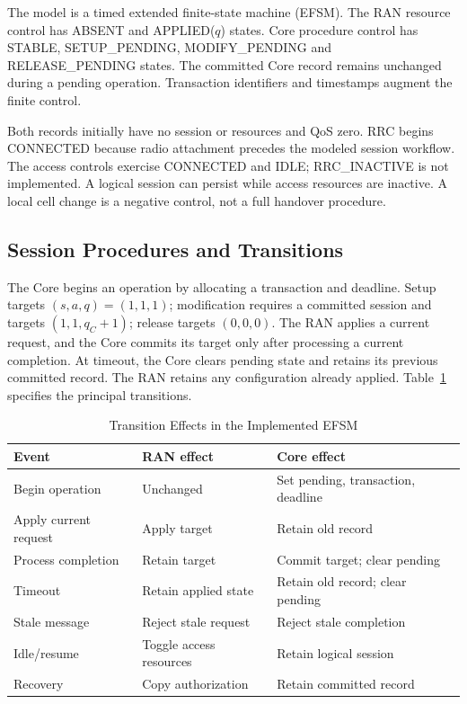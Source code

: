 \documentclass[conference]{IEEEtran}
\begin{document}
The model is a timed extended finite-state machine (EFSM). The RAN resource control has ABSENT and APPLIED($q$) states. Core procedure control has STABLE, SETUP\_PENDING, MODIFY\_PENDING and RELEASE\_PENDING states. The committed Core record remains unchanged during a pending operation. Transaction identifiers and timestamps augment the finite control.

Both records initially have no session or resources and QoS zero. RRC begins CONNECTED because radio attachment precedes the modeled session workflow. The access controls exercise CONNECTED and IDLE; RRC\_INACTIVE is not implemented. A logical session can persist while access resources are inactive. A local cell change is a negative control, not a full handover procedure.

\subsection{Session Procedures and Transitions}
The Core begins an operation by allocating a transaction and deadline. Setup targets $(s,a,q)=(1,1,1)$; modification requires a committed session and targets $(1,1,q_C+1)$; release targets $(0,0,0)$. The RAN applies a current request, and the Core commits its target only after processing a current completion. At timeout, the Core clears pending state and retains its previous committed record. The RAN retains any configuration already applied. Table~\ref{tab:transitions} specifies the principal transitions.

\begin{table}[t]
\caption{Transition Effects in the Implemented EFSM}
\label{tab:transitions}\centering\small
\begin{tabular}{p{}p{}p{}}
\toprule Event & RAN effect & Core effect\\\midrule
Begin operation & Unchanged & Set pending, transaction, deadline\\
Apply current request & Apply target & Retain old record\\
Process completion & Retain target & Commit target; clear pending\\
Timeout & Retain applied state & Retain old record; clear pending\\
Stale message & Reject stale request & Reject stale completion\\
Idle/resume & Toggle access resources & Retain logical session\\
Recovery & Copy authorization & Retain committed record\\\bottomrule
\end{tabular}
\end{table}
\end{document}
